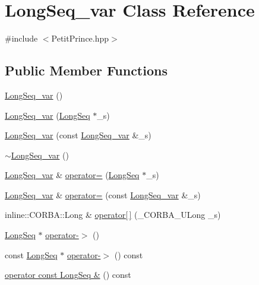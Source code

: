 \hypertarget{class_long_seq__var}{}\section{Long\+Seq\+\_\+var Class Reference}
\label{class_long_seq__var}


{\ttfamily \#include $<$Petit\+Prince.\+hpp$>$}

\subsection*{Public Member Functions}
\begin{DoxyCompactItemize}
\item 
\hyperlink{class_long_seq__var_a597092d8a85c93a22e0b09e3409aa80c}{Long\+Seq\+\_\+var} ()
\item 
\hyperlink{class_long_seq__var_afccf742b50cf0f44c74e0dc0e483ab95}{Long\+Seq\+\_\+var} (\hyperlink{class_long_seq}{Long\+Seq} $\ast$\+\_\+s)
\item 
\hyperlink{class_long_seq__var_a94f16bdd5a172e2a8f9acc18859a2846}{Long\+Seq\+\_\+var} (const \hyperlink{class_long_seq__var}{Long\+Seq\+\_\+var} \&\+\_\+s)
\item 
\hyperlink{class_long_seq__var_ae9d83d2a1e3fcb7e919fe71d5abc5c8c}{$\sim$\+Long\+Seq\+\_\+var} ()
\item 
\hyperlink{class_long_seq__var}{Long\+Seq\+\_\+var} \& \hyperlink{class_long_seq__var_a27548524f7c2460521900089086cb313}{operator=} (\hyperlink{class_long_seq}{Long\+Seq} $\ast$\+\_\+s)
\item 
\hyperlink{class_long_seq__var}{Long\+Seq\+\_\+var} \& \hyperlink{class_long_seq__var_ac7c679fab291a1f214f9533ee8b168f0}{operator=} (const \hyperlink{class_long_seq__var}{Long\+Seq\+\_\+var} \&\+\_\+s)
\item 
inline\+::\+C\+O\+R\+B\+A\+::\+Long \& \hyperlink{class_long_seq__var_aabf764acb1087ab6c0c7575dea9e8cb1}{operator\mbox{[}$\,$\mbox{]}} (\+\_\+\+C\+O\+R\+B\+A\+\_\+\+U\+Long \+\_\+s)
\item 
\hyperlink{class_long_seq}{Long\+Seq} $\ast$ \hyperlink{class_long_seq__var_a95d7fe4ab25d24c689d38a5bc254a2eb}{operator-\/$>$} ()
\item 
const \hyperlink{class_long_seq}{Long\+Seq} $\ast$ \hyperlink{class_long_seq__var_a364e76ae7cfd9bff2697fcb9471ed207}{operator-\/$>$} () const 
\item 
\hyperlink{class_long_seq__var_a4a5a45eddb84b3f4f58f8c3d72c8c2fd}{operator const Long\+Seq \&} () const 

\end{DoxyCompactItemize}
